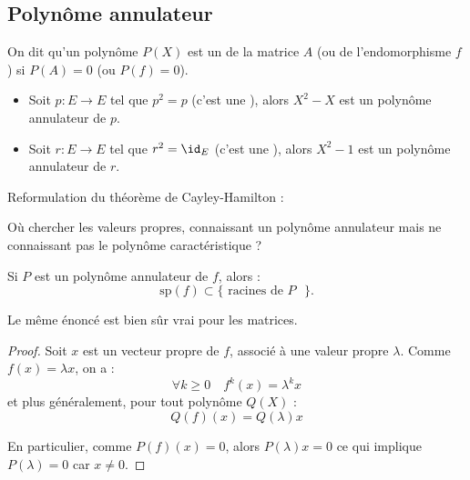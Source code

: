 \documentclass[12pt, class=report,crop=false]{standalone}
\newcommand{\Sp}{\text{sp}}
\begin{document}
\subsection{Polynôme annulateur}


\begin{definition}
On dit qu'un polynôme $P(X)$ est un  de la matrice $A$ (ou de l'endomorphisme $f$) si $P(A) =0$ (ou $P(f) = 0$). 
\end{definition}

\begin{exemple}
\sauteligne
\begin{itemize}

  \item Soit $p : E \to E$ tel que $p ^2=p$ (c'est une ), alors $X^2-X$ est un polynôme annulateur de $p$.

  \item Soit $r : E \to E$ tel que $r^2 =\id_E$ (c'est une ), alors $X^2-1$ est un polynôme annulateur de $r$.
\end{itemize}
\end{exemple}

Reformulation du théorème de Cayley-Hamilton : 



Où chercher les valeurs propres, connaissant un polynôme annulateur mais ne connaissant pas le polynôme caractéristique ?
\begin{proposition}
Si $P$ est un polynôme annulateur de $f$, alors :
\[\Sp (f) \subset \{\text{ racines de $P$ }\}.\]
\end{proposition}
Le même énoncé est bien sûr vrai pour les matrices.

\begin{proof}
Soit $x$ est un vecteur propre de $f$, associé à une valeur propre $\lambda$.
Comme $f(x) = \lambda x$, on a :
\[\forall k \ge 0 \quad f^k(x) = \lambda^k x\]
et plus généralement, pour tout polynôme $Q(X)$ :
\[Q(f)(x) = Q(\lambda)x \]

En particulier, comme $P(f)(x)=0$, alors $P(\lambda) x =0$ ce qui implique 
$P(\lambda) = 0$ car $x \neq 0$.
\end{proof}
\end{document}
